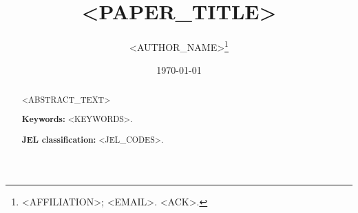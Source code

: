 \documentclass[11pt]{article}
\title{<PAPER_TITLE>}
\author{<AUTHOR_NAME>\thanks{<AFFILIATION>; <EMAIL>. <ACK>.}}
\date{\today}
\begin{document}
\maketitle

\begin{abstract}
\noindent <ABSTRACT_TEXT>
\medskip

\noindent \textbf{Keywords:} <KEYWORDS>.

\noindent \textbf{JEL classification:} <JEL_CODES>.
\end{abstract}

\clearpage











\appendix


\end{document}
